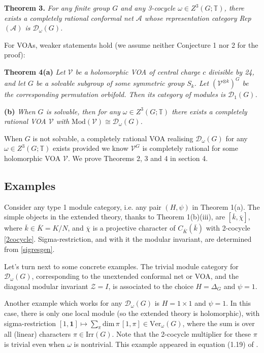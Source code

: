 \documentclass[12pt]{article}
\numberwithin{equation}{section}
\def\cA            {{\mathcal{A}}}
\def\cD            {{\mathcal{D}}}
\def\cV            {{\mathcal{V}}}
\def\cZ            {{\mathcal{Z}}}
\def\bbT           {\mathbb{T}}
\begin{document}
\medskip\noindent\textbf{Theorem 3.} \textit{For any finite group $G$ and any 3-cocycle
$\omega\in Z^3({G};\bbT)$, there exists a completely rational conformal net
$\cA$ whose representation  category Rep$(\cA)$  is $\cD_\omega(G)$.}\medskip

For VOAs,  weaker statements hold (we assume neither Conjecture 1 nor 2 for the proof):

\medskip\noindent\textbf{Theorem 4(a)} \textit{Let $\cV$ be a holomorphic VOA of central charge $c$ divisible by 24, and let $G$ be a solvable subgroup of some symmetric group $S_k$. Let $(\cV^{\otimes k})^G$ be the corresponding permutation orbifold. Then its category of modules is $\cD_1(G)$.}

\medskip\noindent\textbf{(b)} \textit{When $G$
is solvable, then for any $\omega\in Z^3(G;\bbT)$ there exists a completely rational VOA $\cV$
with $\mathrm{Mod}(\cV)\cong \cD_\omega(G)$.}\medskip 


When $G$
is not solvable, a completely rational VOA  realising $\cD_\omega(G)$ for any $\omega\in Z^3(G;\bbT)$
exists provided  we know $\cV^G$ is completely rational for some holomorphic VOA $\cV$. We prove Theorems 2, 3 and 4 in section 4.

\subsection{{Examples}}

Consider any type 1 module category, i.e. any pair $(H,\psi)$  in Theorem 1(a). The simple objects in the extended theory, thanks to Theorem 1(b)(iii), are
 $[\overline{k},\overline{\chi}]$, where $\overline{k}\in\overline{K}=K/N$, and $\overline{\chi}$ is a projective character of $C_{\overline{K}}
(\overline{k})$ with 2-cocycle  \eqref{2cocycle}. Sigma-restriction, and with it the modular invariant, are determined from \eqref{sigresgen}.



Let's turn next to some concrete examples. The trivial module category  for $\cD_\omega(G)$, corresponding 
to the unextended conformal net or VOA, and the diagonal modular invariant $\cZ=I$,  is associated to the choice $H=\Delta_G$ and $\psi=1$.

Another example which works for any $\cD_\omega(G)$ is  $H=1\times 1$ and $\psi=1$. In this case, there
is only one local module (so the extended theory is holomorphic), with sigma-restriction 
$[1,\mathbf{1}]\mapsto \sum_\pi \mathrm{dim}\,\pi\,[1,\pi]\in\mathrm{Ver}_\omega(G)$, where the sum is over all (linear)
characters $\pi\in\mathrm{Irr}(G)$. Note that the 2-cocycle multiplier for these $\pi$ is trivial
even when $\omega$ is nontrivial. This example appeared in equation (1.19) of \cite{EG2}.
\end{document}
